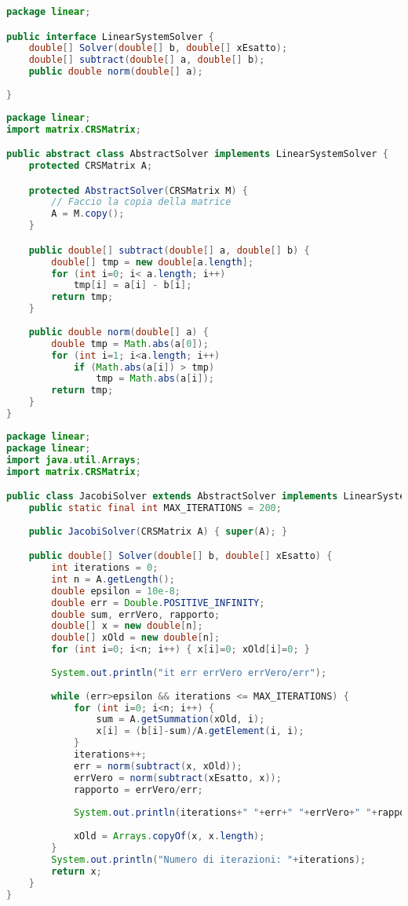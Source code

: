 \documentclass[12pt]{article}
\begin{document}
\newpage
\begin{lstlisting}[language=Java]
package linear;

public interface LinearSystemSolver {
	double[] Solver(double[] b, double[] xEsatto);
	double[] subtract(double[] a, double[] b);
	public double norm(double[] a);
		
}
\end{lstlisting}
\begin{lstlisting}[language=Java]
package linear;
import matrix.CRSMatrix;

public abstract class AbstractSolver implements LinearSystemSolver {
	protected CRSMatrix A;

	protected AbstractSolver(CRSMatrix M) {
		// Faccio la copia della matrice
		A = M.copy();
	}

	public double[] subtract(double[] a, double[] b) {
		double[] tmp = new double[a.length];
		for (int i=0; i< a.length; i++) 
			tmp[i] = a[i] - b[i];
		return tmp;
	}
	
	public double norm(double[] a) {
		double tmp = Math.abs(a[0]);
		for (int i=1; i<a.length; i++)
			if (Math.abs(a[i]) > tmp)
				tmp = Math.abs(a[i]);
		return tmp;
	}
}
\end{lstlisting}
\newpage
\begin{lstlisting}[language=Java]package linear;
package linear;
import java.util.Arrays;
import matrix.CRSMatrix;

public class JacobiSolver extends AbstractSolver implements LinearSystemSolver {
	public static final int MAX_ITERATIONS = 200;
	
	public JacobiSolver(CRSMatrix A) { super(A); }

	public double[] Solver(double[] b, double[] xEsatto) {
		int iterations = 0;
		int n = A.getLength();
		double epsilon = 10e-8;
		double err = Double.POSITIVE_INFINITY;
		double sum, errVero, rapporto;
		double[] x = new double[n];
		double[] xOld = new double[n];		
		for (int i=0; i<n; i++) { x[i]=0; xOld[i]=0; }
				
		System.out.println("it err errVero errVero/err");		
				
		while (err>epsilon && iterations <= MAX_ITERATIONS) {
			for (int i=0; i<n; i++) {
				sum = A.getSummation(xOld, i);
				x[i] = (b[i]-sum)/A.getElement(i, i);
			}
			iterations++;
			err = norm(subtract(x, xOld));
			errVero = norm(subtract(xEsatto, x));
			rapporto = errVero/err;
			
			System.out.println(iterations+" "+err+" "+errVero+" "+rapporto);
			
			xOld = Arrays.copyOf(x, x.length);
		}	
		System.out.println("Numero di iterazioni: "+iterations);
		return x;	
	}
}
\end{lstlisting}
\end{document}

